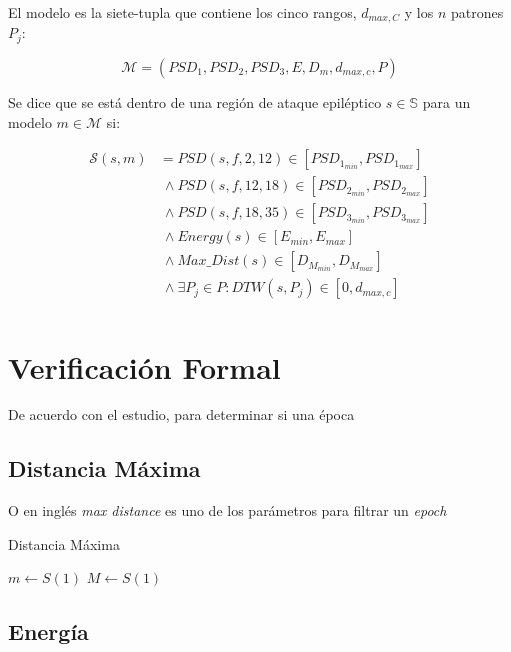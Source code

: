 El modelo es la siete-tupla que contiene los cinco rangos, $d_{max,C}$ y los
$n$ patrones $P_j$:

    \[ \mathcal{M} = (PSD_1, PSD_2, PSD_3, E, D_m, d_{max,c}, P) \]

Se dice que se está dentro de una región de ataque epiléptico $s\in\mathbb{S}$
para un modelo $m\in\mathcal{M}$ si:

\begin{align*}
    \mathscr{S}(s,m) &  =    PSD(s, f,  2,12)\in[PSD_{1_{min}},PSD_{1_{max}}]\\
                     &~\land PSD(s, f, 12,18)\in[PSD_{2_{min}},PSD_{2_{max}}]\\
                     &~\land PSD(s, f, 18,35)\in[PSD_{3_{min}},PSD_{3_{max}}]\\
                     &~\land Energy(s)       \in[E_{min}, E_{max}]        \\
                     &~\land Max\_Dist(s)    \in[D_{M_{min}}, D_{M_{max}}]\\
                     &~\land \exists P_j\in P: DTW(s, P_j) \in [0, d_{max,c}]\\
\end{align*}


\section{Verificación Formal}
De acuerdo con el estudio, para determinar si una época
\subsection{Distancia Máxima}
O en inglés \textit{max distance} es uno de los parámetros para filtrar un
\textit{epoch}

\begin{algorithm}[h]
    \caption{Distancia Máxima}

    \SetAlgoLined
    $m \longleftarrow S(1)$\;
    $M \longleftarrow S(1)$\;

\end{algorithm}

\subsection{Energía}


